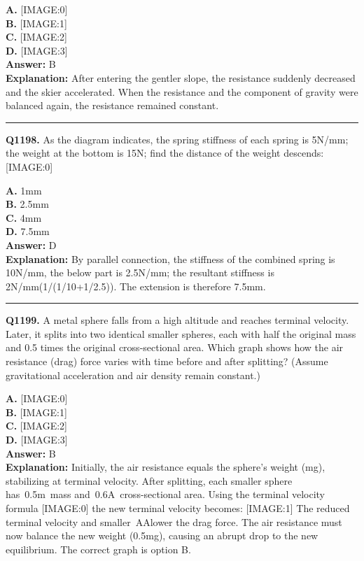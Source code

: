 \documentclass[12pt]{article}
\begin{document}
\textbf{A.} [IMAGE:0] \\
\textbf{B.} [IMAGE:1] \\
\textbf{C.} [IMAGE:2] \\
\textbf{D.} [IMAGE:3] \\

\textbf{Answer:} B \\
\textbf{Explanation:} After entering the gentler slope, the resistance suddenly decreased and the skier accelerated. When the resistance and the component of gravity were balanced again, the resistance remained constant.

\hrule
\vspace{1em}


\noindent
\textbf{Q1198.} As the diagram indicates, the spring stiffness of each spring is 5N/mm; the weight at the bottom is 15N; find the distance of the weight descends:
[IMAGE:0]



\textbf{A.} 1mm \\
\textbf{B.} 2.5mm \\
\textbf{C.} 4mm \\
\textbf{D.} 7.5mm \\

\textbf{Answer:} D \\
\textbf{Explanation:} By parallel connection, the stiffness of the combined spring is 10N/mm, the below part is 2.5N/mm; the resultant stiffness is 2N/mm(1/(1/10+1/2.5)). The extension is therefore 7.5mm.

\hrule
\vspace{1em}


\noindent
\textbf{Q1199.} A metal sphere falls from a high altitude and reaches terminal velocity. Later, it splits into two identical smaller spheres, each with half the original mass and 0.5 times the original cross-sectional area. Which graph shows how the air resistance (drag) force varies with time before and after splitting? (Assume gravitational acceleration and air density remain constant.)



\textbf{A.} [IMAGE:0] \\
\textbf{B.} [IMAGE:1] \\
\textbf{C.} [IMAGE:2] \\
\textbf{D.} [IMAGE:3] \\

\textbf{Answer:} B \\
\textbf{Explanation:} Initially, the air resistance equals the sphere’s weight (mg), stabilizing at terminal velocity. After splitting, each smaller sphere has 0.5m mass and 0.6A cross-sectional area. Using the terminal velocity formula
[IMAGE:0]
the new terminal velocity becomes:
[IMAGE:1]
The reduced terminal velocity and smaller AAlower the drag force. The air resistance must now balance the new weight (0.5mg), causing an abrupt drop to the new equilibrium. The correct graph is option B.
\end{document}
